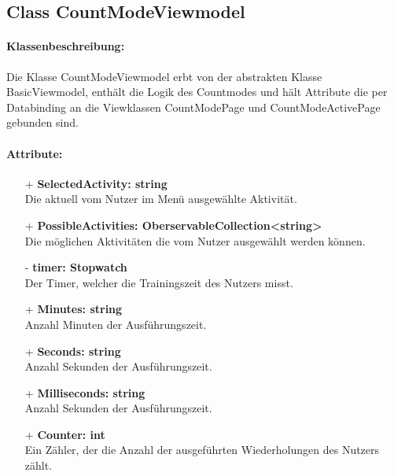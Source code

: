 \documentclass[a4paper,12pt]{article}
\begin{document}
\subsection{Class CountModeViewmodel}
\paragraph{Klassenbeschreibung:}
Die Klasse CountModeViewmodel erbt von der abstrakten Klasse BasicViewmodel, enthält die Logik des Countmodes und hält Attribute die per Databinding an die Viewklassen CountModePage und CountModeActivePage gebunden sind.
\paragraph{Attribute:}
\begin{itemize}
	\item[+] \textbf{SelectedActivity: string} \\ Die aktuell vom Nutzer im Menü ausgewählte Aktivität. 
	\item[+] \textbf{PossibleActivities: OberservableCollection<string>} \\ Die möglichen Aktivitäten die vom Nutzer ausgewählt werden können. 
	\item[-] \textbf{timer: Stopwatch} \\ Der Timer, welcher die Trainingszeit des Nutzers misst. 
	\item[+] \textbf{Minutes: string} \\ Anzahl Minuten der Ausführungszeit. 
	\item[+] \textbf{Seconds: string} \\ Anzahl Sekunden der Ausführungszeit. 
	\item[+] \textbf{Milliseconds: string} \\ Anzahl Sekunden der Ausführungszeit. 
	\item[+] \textbf{Counter: int} \\ Ein Zähler, der die Anzahl der ausgeführten Wiederholungen des Nutzers zählt. 
\end{itemize}
\end{document}
